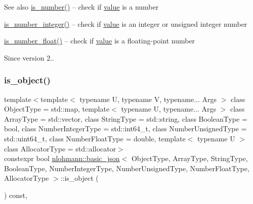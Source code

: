 \begin{DoxySeeAlso}{See also}
\hyperlink{classnlohmann_1_1basic__json_a957eb9594c7f0ca93212c30f3a400873}{is\+\_\+number()} -- check if \hyperlink{classnlohmann_1_1basic__json_a407e73a037e6e3067ef7aa2c25a79f39}{value} is a number 

\hyperlink{classnlohmann_1_1basic__json_a435c93d06ef28f8003c31f62ffe4aed1}{is\+\_\+number\+\_\+integer()} -- check if \hyperlink{classnlohmann_1_1basic__json_a407e73a037e6e3067ef7aa2c25a79f39}{value} is an integer or unsigned integer number 

\hyperlink{classnlohmann_1_1basic__json_a7641371be8a347f3c1e05ac089a74c36}{is\+\_\+number\+\_\+float()} -- check if \hyperlink{classnlohmann_1_1basic__json_a407e73a037e6e3067ef7aa2c25a79f39}{value} is a floating-\/point number
\end{DoxySeeAlso}
\begin{DoxySince}{Since}
version 2.. 
\end{DoxySince}
\hypertarget{classnlohmann_1_1basic__json_a94ba313c00f1713fa4be85de64083754}{}\label{classnlohmann_1_1basic__json_a94ba313c00f1713fa4be85de64083754} 
\subsubsection{\texorpdfstring{is\+\_\+object()}{is\_object()}}
{\footnotesize\ttfamily template$<$template$<$ typename U, typename V, typename... Args $>$ class Object\+Type = std\+::map, template$<$ typename U, typename... Args $>$ class Array\+Type = std\+::vector, class String\+Type  = std\+::string, class Boolean\+Type  = bool, class Number\+Integer\+Type  = std\+::int64\+\_\+t, class Number\+Unsigned\+Type  = std\+::uint64\+\_\+t, class Number\+Float\+Type  = double, template$<$ typename U $>$ class Allocator\+Type = std\+::allocator$>$ \\
constexpr bool \hyperlink{classnlohmann_1_1basic__json}{nlohmann\+::basic\+\_\+json}$<$ Object\+Type, Array\+Type, String\+Type, Boolean\+Type, Number\+Integer\+Type, Number\+Unsigned\+Type, Number\+Float\+Type, Allocator\+Type $>$\+::is\+\_\+object (\begin{DoxyParamCaption}{ }\end{DoxyParamCaption}) const\hspace{0.3cm}{\ttfamily [inline]}, {\ttfamily [noexcept]}}



